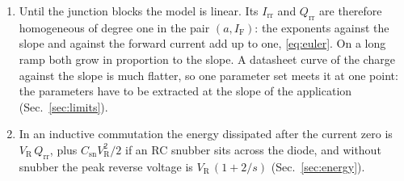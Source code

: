 \documentclass[10pt,a4paper]{scrartcl}
\newcommand{\IF}{I_\mathrm{F}}
\newcommand{\VR}{V_\mathrm{R}}
\newcommand{\Irr}{I_\mathrm{rr}}
\newcommand{\Qrr}{Q_\mathrm{rr}}
\newcommand{\Csn}{C_\mathrm{sn}}
\begin{document}
\begin{enumerate}
\item Until the junction blocks the model is linear. Its $\Irr$ and $\Qrr$ are therefore homogeneous of degree one in the pair $(a, \IF)$: the exponents against the slope and against the forward current add up to one, \eqref{eq:euler}. On a long ramp both grow in proportion to the slope. A datasheet curve of the charge against the slope is much flatter, so one parameter set meets it at one point: the parameters have to be extracted at the slope of the application (Sec.~\ref{sec:limits}).
\item In an inductive commutation the energy dissipated after the current zero is $\VR\,\Qrr$, plus $\Csn\VR^2/2$ if an RC snubber sits across the diode, and without snubber the peak reverse voltage is $\VR\,(1+2/s)$ (Sec.~\ref{sec:energy}).
\end{enumerate}

\end{document}
